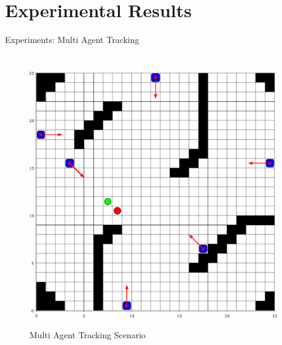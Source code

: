 \documentclass{beamer}
\theoremstyle{remark}
\begin{document}
\section{Experimental Results}
\begin{frame}{Experiments: Multi Agent Tracking}
	\begin{columns}
		\vspace{-11pt}
		\begin{figure}
			\centering
			{\includegraphics[width=.69\columnwidth]{exp1_Corrected2.pdf}}
				\vspace{-5pt}
			\caption*{\tiny Multi Agent Tracking Scenario}
		\end{figure}
				\vspace{-20pt}
						\tiny{
				\begin{exampleblock}


\end{exampleblock}}
\end{columns}
\end{frame}
\end{document}
